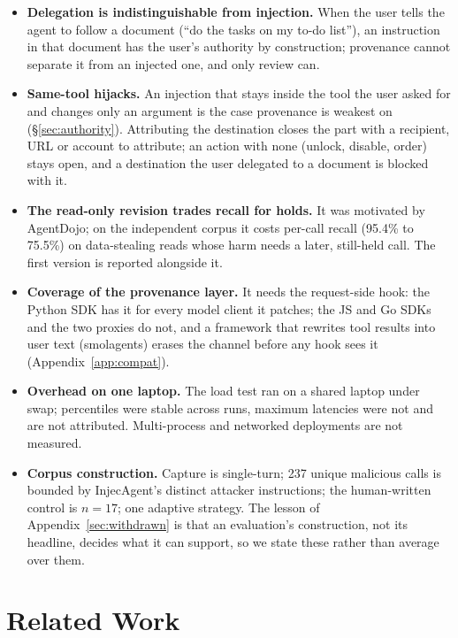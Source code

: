 \documentclass[sigconf,nonacm]{acmart}
\begin{document}
\begin{itemize}[nolistsep,leftmargin=*]



\item \textbf{Delegation is indistinguishable from injection.} When the
  user tells the agent to follow a document (``do the tasks on my to-do
  list''), an instruction in that document has the user's authority by
  construction; provenance cannot separate it from an injected one, and
  only review can.
\item \textbf{Same-tool hijacks.} An injection that stays inside the tool
  the user asked for and changes only an argument is the case
  provenance is weakest on (\S\ref{sec:authority}). Attributing the
  destination closes the part with a recipient, URL or account to
  attribute; an action with none (unlock, disable, order) stays open, and
  a destination the user delegated to a document is blocked with it.
\item \textbf{The read-only revision trades recall for holds.} It was
  motivated by AgentDojo; on the independent corpus it costs per-call
  recall (95.4\% to 75.5\%) on data-stealing reads whose harm needs a
  later, still-held call. The first version is reported alongside it.
\item \textbf{Coverage of the provenance layer.} It needs the request-side
  hook: the Python SDK has it for every model client it patches; the JS
  and Go SDKs and the two proxies do not, and a framework that rewrites
  tool results into user text (smolagents) erases the channel before any
  hook sees it (Appendix~\ref{app:compat}).
\item \textbf{Overhead on one laptop.} The load test ran on a shared
  laptop under swap; percentiles were stable across runs, maximum
  latencies were not and are not attributed. Multi-process and
  networked deployments are not measured.
\item \textbf{Corpus construction.} Capture is single-turn; 237 unique
  malicious calls is bounded by InjecAgent's distinct attacker
  instructions; the human-written control is $n=17$; one adaptive
  strategy. The lesson of Appendix~\ref{sec:withdrawn} is that an
  evaluation's construction, not its headline, decides what it can
  support, so we state these rather than average over them.
\end{itemize}

\section{Related Work}
\label{sec:related}
\end{document}
